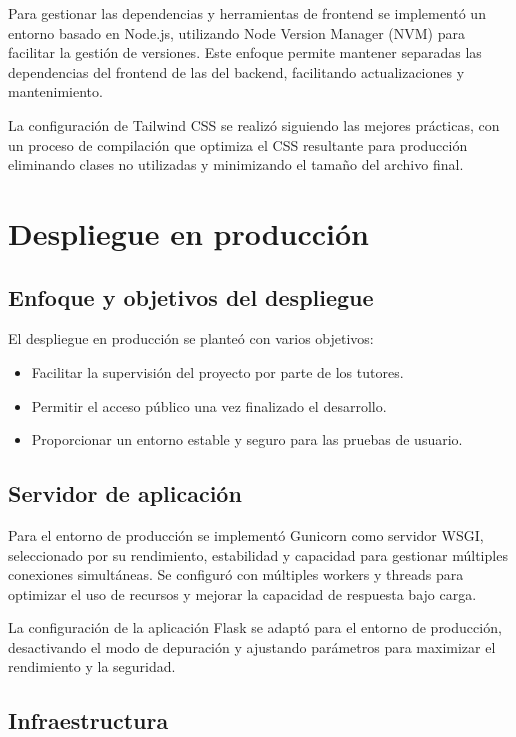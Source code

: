 Para gestionar las dependencias y herramientas de frontend se implementó un entorno basado en Node.js, utilizando Node Version Manager (NVM) para facilitar la gestión de versiones. Este enfoque permite mantener separadas las dependencias del frontend de las del backend, facilitando actualizaciones y mantenimiento.

La configuración de Tailwind CSS se realizó siguiendo las mejores prácticas, con un proceso de compilación que optimiza el CSS resultante para producción eliminando clases no utilizadas y minimizando el tamaño del archivo final.

\section{Despliegue en producción}

\subsection{Enfoque y objetivos del despliegue}

El despliegue en producción se planteó con varios objetivos:
\begin{itemize}
    \item Facilitar la supervisión del proyecto por parte de los tutores.
    \item Permitir el acceso público una vez finalizado el desarrollo.
    \item Proporcionar un entorno estable y seguro para las pruebas de usuario.
\end{itemize}

\subsection{Servidor de aplicación}

Para el entorno de producción se implementó Gunicorn como servidor WSGI, seleccionado por su rendimiento, estabilidad y capacidad para gestionar múltiples conexiones simultáneas. Se configuró con múltiples workers y threads para optimizar el uso de recursos y mejorar la capacidad de respuesta bajo carga.

La configuración de la aplicación Flask se adaptó para el entorno de producción, desactivando el modo de depuración y ajustando parámetros para maximizar el rendimiento y la seguridad.

\subsection{Infraestructura}

